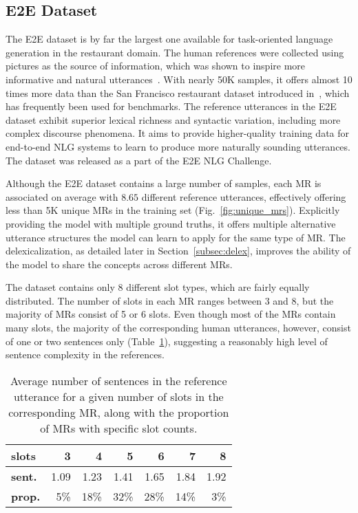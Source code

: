 \documentclass[11pt,a4paper]{article}
\begin{document}
\subsection{E2E Dataset}

The E2E dataset is by far the largest one available for task-oriented language generation in the restaurant domain. The human references were collected using pictures as the source of information, which was shown to inspire more informative and natural utterances~\cite{novikova2016crowd}. With nearly 50K samples, it offers almost 10 times more data than the San Francisco restaurant dataset introduced in~\citet{wen2015semantically}, which has frequently been used for benchmarks. The reference utterances in the E2E dataset exhibit superior lexical richness and syntactic variation, including more complex discourse phenomena. It aims to provide higher-quality training data for end-to-end NLG systems to learn to produce more naturally sounding utterances. The dataset was released as a part of the E2E NLG Challenge.

Although the E2E dataset contains a large number of samples, each MR is associated on average with $8.65$ different reference utterances, effectively offering less than 5K unique MRs in the training set (Fig.~\ref{fig:unique_mrs}). Explicitly providing the model with multiple ground truths, it offers multiple alternative utterance structures the model can learn to apply for the same type of MR. The delexicalization, as detailed later in Section~\ref{subsec:delex}, improves the ability of the model to share the concepts across different MRs.

The dataset contains only 8 different slot types, which are fairly equally distributed. The number of slots in each MR ranges between 3 and 8, but the majority of MRs consist of 5 or 6 slots. Even though most of the MRs contain many slots, the majority of the corresponding human utterances, however, consist of one or two sentences only (Table~\ref{table:sentence_average}), suggesting a reasonably high level of sentence complexity in the references.

\begin{table}
  \small
  \centering
  \begin{tabular}{l r r r r r r}
    \toprule
    \textbf{slots}	& 3	& 4	& 5	& 6	& 7	& 8 \\
    \midrule
    \textbf{sent.}	& 1.09 & 1.23 & 1.41 & 1.65 & 1.84 & 1.92 \\
    \textbf{prop.}	& 5\% & 18\% & 32\% & 28\% & 14\% & 3\% \\
    \bottomrule
  \end{tabular}
  \caption{Average number of sentences in the reference utterance for a given number of slots in the corresponding MR, along with the proportion of MRs with specific slot counts.}
  \label{table:sentence_average}
\end{table}
\end{document}
